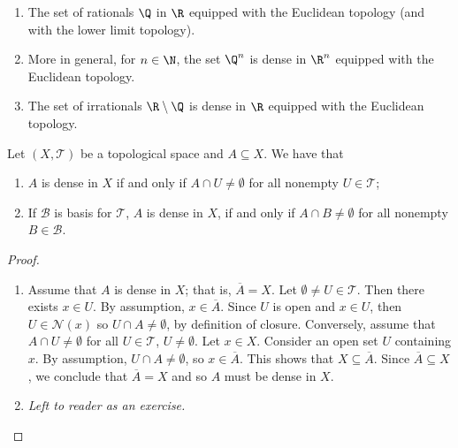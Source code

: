 \begin{eg}
    \begin{enumerate}
        \item[(i)] The set of rationals \( \Q  \) in \( \R  \) equipped with the Euclidean topology (and with the lower limit topology).
        \item[(ii)] More in general, for \( n \in \N  \), the set \( \Q^{n}  \) is dense in \( \R^{n} \) equipped with the Euclidean topology.
        \item[(iii)] The set of irrationals \( \R \setminus  \Q  \) is dense in \( \R  \) equipped with the Euclidean topology.
    \end{enumerate}
\end{eg}

\begin{prop}
    Let \( (X,\mathcal{T}) \) be a topological space and \( A \subseteq X  \). We have that 
    \begin{enumerate}
        \item[(i)] \( A  \) is dense in \( X  \) if and only if \( A \cap U \neq \emptyset \) for all nonempty \( U \in \mathcal{T} \);
        \item[(ii)] If \( \mathcal{B} \) is basis for \( \mathcal{T} \), \( A  \) is dense in \( X  \), if and only if \( A \cap B \neq \emptyset \) for all nonempty \( B \in \mathcal{B} \).
    \end{enumerate}
\end{prop}
\begin{proof}
    \begin{enumerate}
        \item[(i)] Assume that \( A  \) is dense in \( X  \); that is, \( \overline{A} = X  \). Let \( \emptyset \neq U \in \mathcal{T} \). Then there exists \( x \in U  \). By assumption, \( x \in \overline{A} \). Since \( U  \) is open and \( x \in U  \), then \( U \in \mathcal{N}(x) \) so \( U \cap A \neq \emptyset \), by definition of closure.
        Conversely, assume that \( A \cap U \neq \emptyset \) for all \( U \in \mathcal{T} \), \( U \neq \emptyset \). Let \( x \in X  \). Consider an open set \( U  \) containing \( x  \). By assumption, \( U \cap A \neq \emptyset \), so \( x \in \overline{A} \). This shows that \( X \subseteq \overline{A} \). Since \( \overline{A} \subseteq X  \), we conclude that \( \overline{A} = X  \) and so \( A  \) must be dense in \( X  \).
        \item[(ii)] \textit{Left to reader as an exercise.} 
    \end{enumerate}
\end{proof}


